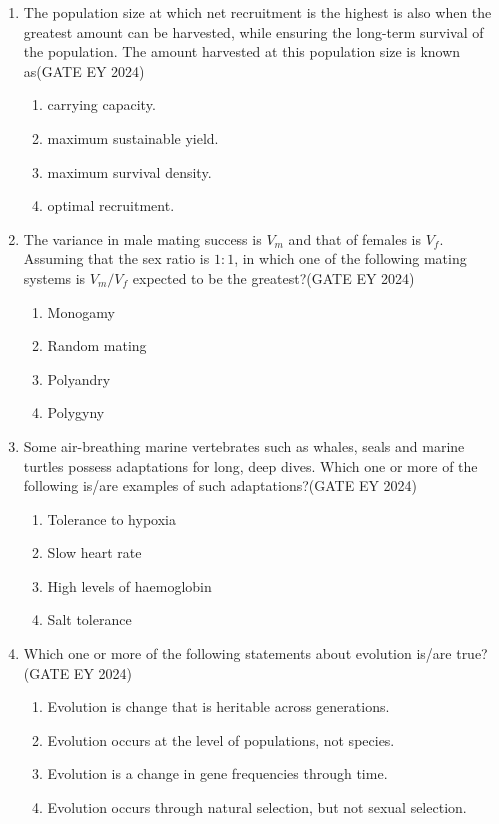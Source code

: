 \begin{enumerate}
\item The population size at which net recruitment is the highest is also when the greatest amount can be harvested, while ensuring the long-term survival of the population. The amount harvested at this population size is known as\hfill{(GATE EY 2024)}
    \begin{multicols}{2}
    \begin{enumerate}
        \item carrying capacity.
        \item maximum sustainable yield.
        \item maximum survival density.
        \item optimal recruitment.
    \end{enumerate}
    \end{multicols}

\item The variance in male mating success is $V_m$ and that of females is $V_f$. Assuming that the sex ratio is $1:1$, in which one of the following mating systems is $V_m/V_f$ expected to be the greatest?\hfill{(GATE EY 2024)}
    \begin{multicols}{2}
    \begin{enumerate}
        \item Monogamy
        \item Random mating
        \item Polyandry
        \item Polygyny
    \end{enumerate}
    \end{multicols}

\item Some air-breathing marine vertebrates such as whales, seals and marine turtles possess adaptations for long, deep dives. Which one or more of the following is/are examples of such adaptations?\hfill{(GATE EY 2024)}
    \begin{multicols}{2}
    \begin{enumerate}
        \item Tolerance to hypoxia
        \item Slow heart rate
        \item High levels of haemoglobin
        \item Salt tolerance
    \end{enumerate}
    \end{multicols}

\item Which one or more of the following statements about evolution is/are true?\hfill{(GATE EY 2024)}
    \begin{enumerate}
        \item Evolution is change that is heritable across generations.
        \item Evolution occurs at the level of populations, not species.
        \item Evolution is a change in gene frequencies through time.
        \item Evolution occurs through natural selection, but not sexual selection.
    \end{enumerate}


\end{enumerate}
